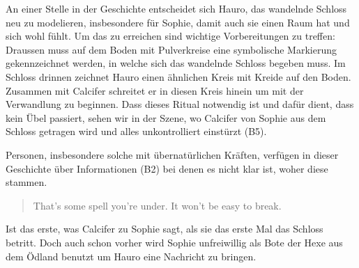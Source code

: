An einer Stelle in der Geschichte entscheidet sich Hauro, das wandelnde Schloss neu zu modelieren, insbesondere für Sophie, damit auch sie einen Raum hat und sich wohl fühlt. Um das zu erreichen sind wichtige Vorbereitungen zu treffen: Draussen muss auf dem Boden mit Pulverkreise eine symbolische Markierung gekennzeichnet werden, in welche sich das wandelnde Schloss begeben muss. Im Schloss drinnen zeichnet Hauro einen ähnlichen Kreis mit Kreide auf den Boden. Zusammen mit Calcifer schreitet er in diesen Kreis hinein um mit der Verwandlung zu beginnen. Dass dieses Ritual notwendig ist und dafür dient, dass kein Übel passiert, sehen wir in der Szene, wo Calcifer von Sophie aus dem Schloss getragen wird und alles unkontrolliert einstürzt (B5).

Personen, insbesondere solche mit übernatürlichen Kräften, verfügen in dieser Geschichte über Informationen (B2) bei denen es nicht klar ist, woher diese stammen.\begin{quote} \glqq That's some spell you're under. It won't be easy to break.\grqq \end{quote} Ist das erste, was Calcifer zu Sophie sagt, als sie das erste Mal das Schloss betritt. Doch auch schon vorher wird Sophie unfreiwillig als Bote der Hexe aus dem Ödland benutzt um Hauro eine Nachricht zu bringen. 